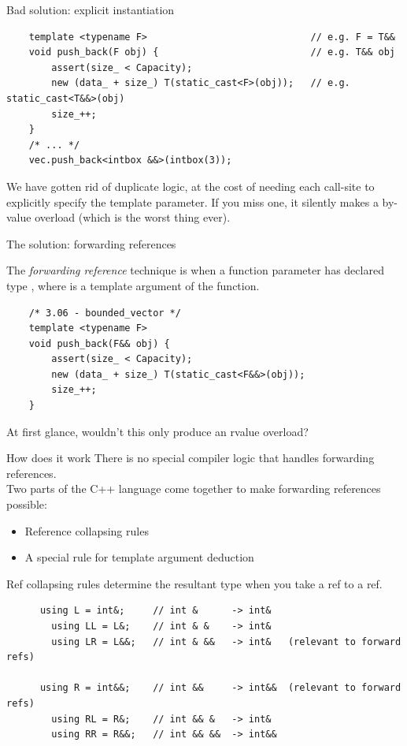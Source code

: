 \begin{frame}[fragile]{Bad solution: explicit instantiation}
  \begin{verbatim}
    template <typename F>                             // e.g. F = T&&
    void push_back(F obj) {                           // e.g. T&& obj
        assert(size_ < Capacity);
        new (data_ + size_) T(static_cast<F>(obj));   // e.g. static_cast<T&&>(obj)
        size_++;
    }
    /* ... */
    vec.push_back<intbox &&>(intbox(3));
  \end{verbatim}

  We have gotten rid of duplicate logic, at the cost of needing each call-site
  to explicitly specify the template parameter. If you miss one, it silently
  makes a by-value overload (which is the worst thing ever).  
\end{frame}

\begin{frame}[fragile]{The solution: forwarding references}
  \begin{sqt:definition}
    The \emph{forwarding reference} technique is when a function parameter has declared type
    , where  is a template argument of the function.
  \end{sqt:definition}

  \begin{verbatim}
    /* 3.06 - bounded_vector */
    template <typename F>
    void push_back(F&& obj) {
        assert(size_ < Capacity);
        new (data_ + size_) T(static_cast<F&&>(obj));
        size_++;
    }
  \end{verbatim}

  At first glance, wouldn't this only produce an rvalue overload?
\end{frame}

\begin{frame}[fragile]{How does it work}
  There is no special compiler logic that handles forwarding references.\\
  Two parts of the C++ language come together to make forwarding references possible:
  \begin{itemize}
    \item Reference collapsing rules
    \item A special rule for template argument deduction
  \end{itemize}

  Ref collapsing rules determine the resultant type when you take a ref to a ref.

  \begin{verbatim}
      using L = int&;     // int &      -> int&
        using LL = L&;    // int & &    -> int&
        using LR = L&&;   // int & &&   -> int&   (relevant to forward refs)

      using R = int&&;    // int &&     -> int&&  (relevant to forward refs)
        using RL = R&;    // int && &   -> int&
        using RR = R&&;   // int && &&  -> int&&
  \end{verbatim}
\end{frame}


